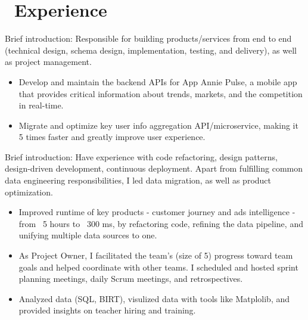 \documentclass{resume}
\begin{document}



\section{\faUsers\ Experience}
\role{Web Backend Engineer}{}
Brief introduction: Responsible for building products/services from end to end (technical design, schema design, implementation, testing, and delivery), as well as project management.
\begin{itemize}
  \item Develop and maintain the backend APIs for App Annie Pulse, a mobile app that provides critical information about trends, markets, and the competition in real-time.
  \item Migrate and optimize key user info aggregation API/microservice, making it 5 times faster and greatly improve user experience.
\end{itemize}

Brief introduction: Have experience with code refactoring, design patterns, design-driven development, continuous deployment. Apart from fulfilling common data engineering responsibilities, I led data migration, as well as product optimization.
\begin{itemize}
  \item Improved runtime of key products - customer journey and ads intelligence - from ~5 hours to ~300 ms, by refactoring code, refining the data pipeline, and unifying multiple data sources to one. 
  \item As Project Owner, I facilitated the team’s (size of 5) progress toward team goals and helped coordinate with other teams. I scheduled and hosted sprint planning meetings, daily Scrum meetings, and retrospectives.
\end{itemize}

\begin{itemize}
  \item Analyzed data (SQL, BIRT), visulized data with tools like Matplolib, and provided insights on teacher hiring and training.
\end{itemize}
\end{document}
